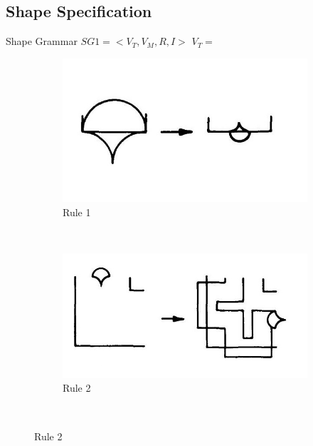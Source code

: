 \documentclass[11pt, a4paper]{report}
\begin{document}
\subsection{Shape Specification}
Shape Grammar \newline
$SG1 = <V_T, V_M, R, I>$
$V_T = $
\begin{figure}[!h]
    \centering
    \begin{subfigure}[b]{0.3\textwidth}
        \includegraphics[width=\textwidth]{sg_specification_rule1.jpg}
        \caption{Rule 1}
        \label{fig:Shape Grammars/Shape Specification/Rule 1}
    \end{subfigure}
    ~ %
    \begin{subfigure}[b]{0.3\textwidth}
        \includegraphics[width=\textwidth]{sg_specification_rule2.jpg}
        \caption{Rule 2}
        \label{fig:Shape Grammars/Shape Specification/Rule 2}
    \end{subfigure}
    ~ %

\end{figure}
\end{document}
